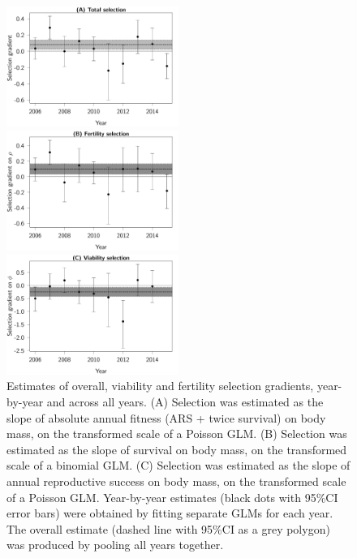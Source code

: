 \begin{figure}[H]
\centering
	\includegraphics[width=0.5\textwidth]{FiguresFluSel/SelByYear-1}
	
	\includegraphics[width=0.5\textwidth]{FiguresFluSel/SelByYearRho-1}
	
	\includegraphics[width=0.5\textwidth]{FiguresFluSel/SelByYearPhi-1}
	\caption{\footnotesize Estimates of overall, viability and fertility selection gradients, year-by-year and across all years. (A) Selection was estimated as the slope of absolute annual fitness (ARS + twice survival) on body mass, on the transformed scale of a Poisson GLM. (B) Selection was estimated as the slope of survival on body mass, on the transformed scale of a binomial GLM. (C) Selection was estimated as the slope of annual reproductive success on body mass, on the transformed scale of a Poisson GLM.
	Year-by-year estimates (black dots with 95\%CI error bars) were obtained by fitting separate GLMs for each year. The overall estimate (dashed line with 95\%CI as a grey polygon) was produced by pooling all years together.}
	\label{fig:yearSel}
\end{figure}

